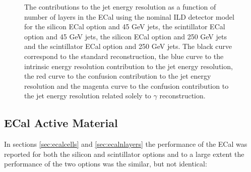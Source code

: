 \begin{figure}
\caption[The contributions to the jet energy resolution as a function of number of layers in the ECal using the nominal ILD detector model for \protect{} the silicon ECal option and 45 GeV jets, \protect{} the scintillator ECal option and 45 GeV jets, \protect{} the silicon ECal option and 250 GeV jets and \protect{} the scintillator ECal option and 250 GeV jets.  The black curve correspond to the standard reconstruction, the blue curve to the intrinsic energy resolution contribution to the jet energy resolution, the red curve to the confusion contribution to the jet energy resolution and the magenta curve to the confusion contribution to the jet energy resolution related solely to $\gamma$ reconstruction.]{The contributions to the jet energy resolution as a function of number of layers in the ECal using the nominal ILD detector model for \protect{} the silicon ECal option and 45 GeV jets, \protect{} the scintillator ECal option and 45 GeV jets, \protect{} the silicon ECal option and 250 GeV jets and \protect{} the scintillator ECal option and 250 GeV jets.  The black curve correspond to the standard reconstruction, the blue curve to the intrinsic energy resolution contribution to the jet energy resolution, the red curve to the confusion contribution to the jet energy resolution and the magenta curve to the confusion contribution to the jet energy resolution related solely to $\gamma$ reconstruction.}
\label{fig:ecalnlayersbreak}
\end{figure}


\subsection{ECal Active Material}
In sections \ref{sec:ecalcells} and \ref{sec:ecalnlayers} the performance of the ECal was reported for both the silicon and scintillator options and to a large extent the performance of the two options was the similar, but not identical:

